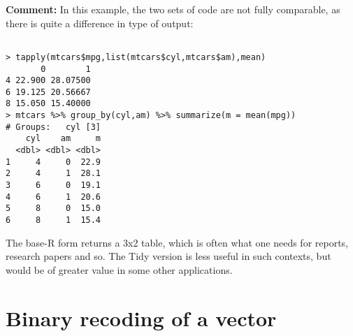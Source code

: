 \documentclass[11pt]{article}
\begin{document}
\begin{parcolumns}[rulebetween=true]{2}


\hspace{0.1in}


\end{parcolumns}

\textbf{Comment:}  
In this example, the two sets of code are not fully comparable,
as there is quite a difference in type of output:

\begin{lstlisting}

> tapply(mtcars$mpg,list(mtcars$cyl,mtcars$am),mean)
       0        1
4 22.900 28.07500
6 19.125 20.56667
8 15.050 15.40000
> mtcars %>% group_by(cyl,am) %>% summarize(m = mean(mpg))
# Groups:   cyl [3]
    cyl    am     m
  <dbl> <dbl> <dbl>
1     4     0  22.9
2     4     1  28.1
3     6     0  19.1
4     6     1  20.6
5     8     0  15.0
6     8     1  15.4

\end{lstlisting}

The base-R form returns a 3x2 table, which is often what one needs for
reports, research papers and so.  The Tidy version is less useful in
such contexts, but would be of greater value in some other applications.

\section*{Binary recoding of a vector}
\end{document}
